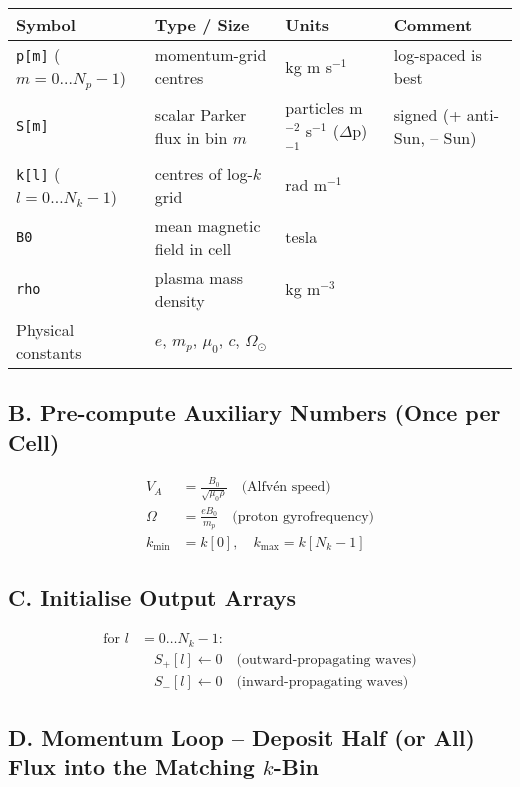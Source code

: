 \begin{center}
\renewcommand{\arraystretch}{1.2}
\begin{tabular}{|l|l|l|l|}
\hline
\textbf{Symbol} & \textbf{Type / Size} & \textbf{Units} & \textbf{Comment} \\
\hline
\texttt{p[m]} ($m = 0 \dots N_p{-}1$) & momentum-grid centres & kg m s$^{-1}$ & log-spaced is best \\
\texttt{S[m]} & scalar Parker flux in bin $m$ & particles m$^{-2}$ s$^{-1}$ ($\Delta$p)$^{-1}$ & signed (+ anti-Sun, – Sun) \\
\texttt{k[l]} ($l = 0 \dots N_k{-}1$) & centres of log-$k$ grid & rad m$^{-1}$ & \\
\texttt{B0} & mean magnetic field in cell & tesla & \\
\texttt{rho} & plasma mass density & kg m$^{-3}$ & \\
Physical constants & $e$, $m_p$, $\mu_0$, $c$, $\Omega_\odot$ & & \\
\hline
\end{tabular}
\end{center}

\subsection*{B. Pre-compute Auxiliary Numbers (Once per Cell)}

\[
\begin{aligned}
V_A &= \frac{B_0}{\sqrt{\mu_0 \rho}} \quad \text{(Alfvén speed)} \\
\Omega &= \frac{e B_0}{m_p} \quad \text{(proton gyrofrequency)} \\
k_{\min} &= k[0], \quad k_{\max} = k[N_k{-}1]
\end{aligned}
\]

\subsection*{C. Initialise Output Arrays}

\[
\begin{aligned}
\text{for } l &= 0 \dots N_k{-}1: \\
&\quad S_{+}[l] \leftarrow 0 \quad \text{(outward-propagating waves)} \\
&\quad S_{-}[l] \leftarrow 0 \quad \text{(inward-propagating waves)}
\end{aligned}
\]

\subsection*{D. Momentum Loop – Deposit Half (or All) Flux into the Matching $k$-Bin}

